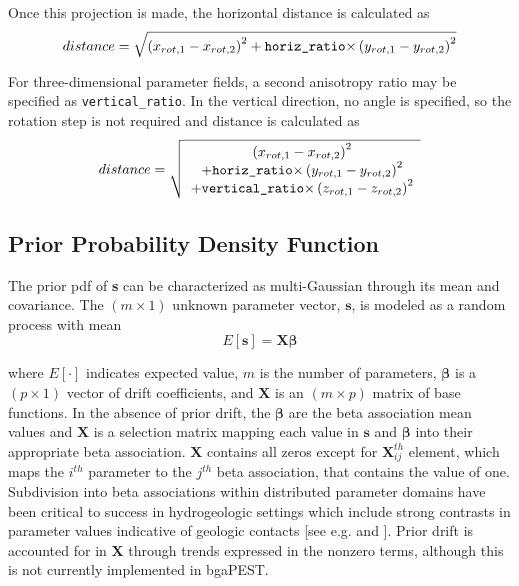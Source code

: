 \documentclass[11pt,oneside,onecolumn]{usgsreport}
\begin{document}
\begin{appendix}
Once this projection is made, the horizontal distance is calculated
as
\[
distance=\sqrt{\left(x_{rot,1}-x_{rot,2}\right)^{2}+\texttt{{horiz\_ratio}\ensuremath{\times}}\left(y_{rot,1}-y_{rot,2}\right)^{2}}
\]


For three-dimensional parameter fields, a second anisotropy ratio
may be specified as \texttt{vertical\_ratio}. In the vertical direction,
no angle is specified, so the rotation step is not required and distance
is calculated as
\[
distance=\sqrt{\begin{array}{c}
\left(x_{rot,1}-x_{rot,2}\right)^{2}\\
+\texttt{{horiz\_ratio}\ensuremath{\times}}\left(y_{rot,1}-y_{rot,2}\right)^{2}\\
+\texttt{{vertical\_ratio}\ensuremath{\times}}\left(z_{rot,1}-z_{rot,2}\right)^{2}
\end{array}}
\]



\subsection{\label{sub:Prior-Probability-Density}Prior Probability Density Function}

The prior pdf of \textbf{s} can be characterized as multi-Gaussian
through its mean and covariance. The $(m\times1)$ unknown parameter
vector, $\mathbf{s}$, is modeled as a random process with mean
\begin{equation}
E[\mathbf{s}]=\mathbf{X}\mathbf{\beta}\label{eq:Es}
\end{equation}


where $E[\cdot]$ indicates expected value, $m$ is the number of
parameters, $\mathbf{\beta}$ is a $(p\times1)$ vector of drift coefficients,
and $\mathbf{X}$ is an $(m\times p)$ matrix of base functions. In
the absence of prior drift, the $\mathbf{\beta}$ are the beta association
mean values and $\mathbf{X}$ is a selection matrix mapping each value
in $\mathbf{s}$ and $\mathbf{\beta}$ into their appropriate beta
association. $\mathbf{X}$ contains all zeros except for \textbf{$\mathbf{X}_{ij}^{th}$}
element, which maps the $i^{th}$ parameter to the $j^{th}$ beta
association, that contains the value of one. Subdivision into beta
associations within distributed parameter domains have been critical
to success in hydrogeologic settings which include strong contrasts
in parameter values indicative of geologic contacts {[}see e.g. \citealp{fienenEtal2004}
and \citealp{FienenWRR2008}{]}. Prior drift is accounted for in $\mathbf{X}$
through trends expressed in the nonzero terms, although this is not
currently implemented in bgaPEST.


\end{appendix}
\end{document}
